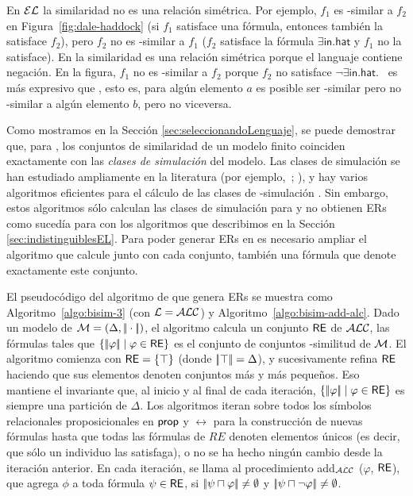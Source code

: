 En $\mathcal{EL}$ la similaridad no es una relaci\'on sim\'etrica. Por ejemplo, $f_1$ es \el-similar a $f_2$ en
Figura~\ref{fig:dale-haddock} (si $f_1$ satisface una f\'ormula, entonces tambi\'en la satisface $f_2$), pero $f_2$ no es \el-similar a $f_1$
($f_2$ satisface la f\'ormula $\exists \mathsf{in}.\mathsf{hat}$ y $f_1$
no la satisface). En \alc la similaridad es una relaci\'on sim\'etrica porque
el languaje contiene negaci\'on. En la figura, $f_1$ no es \alc-similar
a $f_2$ porque $f_2$ no satisface $\neg \exists
\mathsf{in}.\mathsf{hat}$. \alc\ es m\'as expresivo que \el,
esto es, para alg\'un elemento $a$ es posible ser \el-similar pero
no \alc-similar a alg\'un elemento $b$, pero no viceversa.

Como mostramos en la Secci\'on \ref{sec:seleccionandoLenguaje}, se puede demostrar que, para \ALC, los conjuntos de similaridad de un modelo finito
coinciden exactamente con las \emph{clases de simulaci\'on} del modelo. Las
clases de simulaci\'on se han estudiado ampliamente en la literatura
(por ejemplo,~\cite{BRV01}; \cite {Kurt:expr99}), y hay varios
algoritmos eficientes para el c\'alculo de las clases de \alc-simulaci\'on
\cite{hopc:algo71,paig:thre87,dovier04:_effic_algor_for_comput_bisim_equiv}.
Sin embargo, estos algoritmos s\'olo calculan las clases de simulaci\'on para \alc y no obtienen ERs como suced\'ia para \EL con los algoritmos que describimos en la Secci\'on \ref{sec:indistinguiblesEL}. Para poder generar ERs en \alc es necesario ampliar el algoritmo \cite{hopc:algo71} que
calcule junto con cada conjunto, tambi\'en una f\'ormula que denote
exactamente este conjunto.
 
El pseudoc\'odigo del algoritmo de \ALC que genera ERs se muestra como
Algoritmo~\ref{algo:bisim-3} (con $\mathcal{L}=\mathcal{ALC}$) y
Algoritmo~\ref{algo:bisim-add-alc}. Dado un modelo de $\mathcal{M}=(\Delta,
|\!|\cdot|\!|)$, el algoritmo calcula un conjunto $\textsf{RE}$ de $\mathcal{ALC}$, las
f\'ormulas tales que $ \{|\!|\varphi|\!| \mid \varphi \in \textsf{RE} \} $ es el
conjunto de conjuntos \alc-similitud de $\mathcal{M}$. El algoritmo comienza con $ \textsf{RE}
= \{\top \} $ (donde $ |\!|\top|\!| = \Delta $), y sucesivamente refina
$\textsf{RE}$ haciendo que sus elementos denoten conjuntos m\'as y m\'as peque\~nos. Eso
mantiene el invariante que, al inicio y al final de cada iteraci\'on,
$\{|\!|\varphi|\!| \mid \varphi \in \textsf{RE}\}$ es siempre una partici\'on de
$ \Delta $. Los algoritmos iteran sobre todos los
s\'imbolos relacionales proposicionales en $ \mathsf{prop} $ y $\rel $ para la construcci\'on de nuevas f\'ormulas
hasta que todas las f\'ormulas de $RE$ denoten elementos \'unicos (es decir, que
s\'olo un individuo las satisfaga), o no se ha hecho ning\'un cambio desde la
 iteraci\'on anterior. En cada iteraci\'on, se llama al procedimiento
add$_\mathcal{ALC}$ ($ \varphi $, $\textsf{RE}$), que agrega $ \phi $ a toda
f\'ormula $\psi \in \textsf{RE} $, 
si $|\!|\psi \sqcap \varphi|\!| \not = \emptyset$ y $|\!|\psi \sqcap \neg \varphi|\!| \not = \emptyset$.

